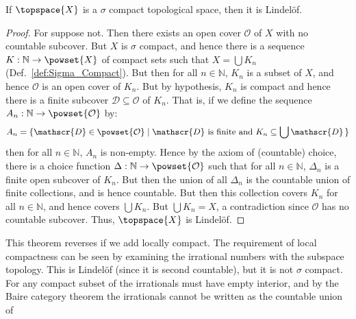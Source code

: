         \begin{theorem}
            \label{thm:Sigma_Compact_Implies_Lindelof}%
            If $\topspace{X}$ is a $\sigma$ compact topological space, then it
            is Lindel\"{o}f.
        \end{theorem}
        \begin{proof}
            For suppose not. Then there exists an open cover $\mathcal{O}$ of
            $X$ with no countable subcover. But $X$ is $\sigma$ compact, and
            hence there is a sequence $K:\mathbb{N}\rightarrow\powset{X}$ of
            compact sets such that $X=\bigcup{K}_{n}$
            (Def.~\ref{def:Sigma_Compact}). But then for all $n\in\mathbb{N}$,
            $K_{n}$ is a subset of $X$, and hence $\mathcal{O}$ is an open cover
            of $K_{n}$. But by hypothesis, $K_{n}$ is compact and hence there is
            a finite subcover $\mathscr{D}\subseteq\mathcal{O}$ of $K_{n}$. That
            is, if we define the sequence
            $A_{n}:\mathbb{N}\rightarrow\powset{\mathcal{O}}$ by:
            \begin{equation}
                A_{n}=\{\mathscr{D}\in\powset{\mathcal{O}}\;|\;
                    \mathscr{D}\textrm{ is finite and }
                    K_{n}\subseteq\bigcup\mathscr{D}\,\}
            \end{equation}
            then for all $n\in\mathbb{N}$, $A_{n}$ is non-empty. Hence by the
            axiom of (countable) choice, there is a choice function
            $\Delta:\mathbb{N}\rightarrow\powset{\mathcal{O}}$ such that for all
            $n\in\mathbb{N}$, $\Delta_{n}$ is a finite open subcover of $K_{n}$.
            But then the union of all $\Delta_{n}$ is the countable union of
            finite collections, and is hence countable. But then this collection
            covers $K_{n}$ for all $n\in\mathbb{N}$, and hence covers
            $\bigcup{K}_{n}$. But $\bigcup{K}_{n}=X$, a contradiction since
            $\mathcal{O}$ has no countable subcover. Thus, $\topspace{X}$ is
            Lindel\"{o}f.
        \end{proof}
        This theorem reverses if we add locally compact. The requirement of
        local compactness can be seen by examining the irrational numbers with
        the subspace topology. This is Lindel\"{o}f (since it is second
        countable), but it is not $\sigma$ compact. For any compact subset of
        the irrationals must have empty interior, and by the Baire category
        theorem the irrationals cannot be written as the countable union of
